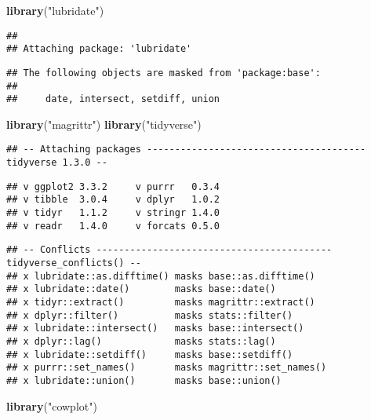 \documentclass[
]{article}
\author{}
\date{\vspace{-2.5em}}
\newenvironment{Shaded}{\begin{snugshade}}{\end{snugshade}}
\newcommand{\KeywordTok}[1]{\textcolor[rgb]{0.13,0.29,0.53}{\textbf{#1}}}
\newcommand{\NormalTok}[1]{#1}
\newcommand{\StringTok}[1]{\textcolor[rgb]{0.31,0.60,0.02}{#1}}
\begin{document}
\begin{Shaded}
\begin{Highlighting}[]
\KeywordTok{library}\NormalTok{(}\StringTok{"lubridate"}\NormalTok{)}
\end{Highlighting}
\end{Shaded}

\begin{verbatim}
## 
## Attaching package: 'lubridate'
\end{verbatim}

\begin{verbatim}
## The following objects are masked from 'package:base':
## 
##     date, intersect, setdiff, union
\end{verbatim}

\begin{Shaded}
\begin{Highlighting}[]
\KeywordTok{library}\NormalTok{(}\StringTok{"magrittr"}\NormalTok{)}
\KeywordTok{library}\NormalTok{(}\StringTok{"tidyverse"}\NormalTok{)}
\end{Highlighting}
\end{Shaded}

\begin{verbatim}
## -- Attaching packages --------------------------------------- tidyverse 1.3.0 --
\end{verbatim}

\begin{verbatim}
## v ggplot2 3.3.2     v purrr   0.3.4
## v tibble  3.0.4     v dplyr   1.0.2
## v tidyr   1.1.2     v stringr 1.4.0
## v readr   1.4.0     v forcats 0.5.0
\end{verbatim}

\begin{verbatim}
## -- Conflicts ------------------------------------------ tidyverse_conflicts() --
## x lubridate::as.difftime() masks base::as.difftime()
## x lubridate::date()        masks base::date()
## x tidyr::extract()         masks magrittr::extract()
## x dplyr::filter()          masks stats::filter()
## x lubridate::intersect()   masks base::intersect()
## x dplyr::lag()             masks stats::lag()
## x lubridate::setdiff()     masks base::setdiff()
## x purrr::set_names()       masks magrittr::set_names()
## x lubridate::union()       masks base::union()
\end{verbatim}

\begin{Shaded}
\begin{Highlighting}[]
\KeywordTok{library}\NormalTok{(}\StringTok{"cowplot"}\NormalTok{)}
\end{Highlighting}
\end{Shaded}
\end{document}
